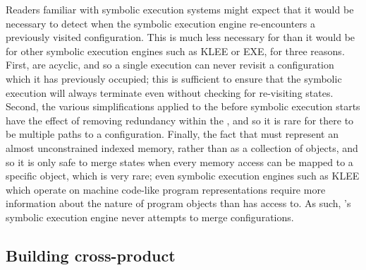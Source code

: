 Readers familiar with symbolic execution systems might expect that it
would be necessary to detect when the symbolic execution engine
re-encounters a previously visited configuration.  This is much less
necessary for {\technique} than it would be for other symbolic
execution engines such as KLEE\needCite{} or EXE\needCite{}, for three
reasons.  First, {\technique} {\StateMachines} are acyclic, and so a
single execution can never revisit a configuration which it has
previously occupied; this is sufficient to ensure that the symbolic
execution will always terminate even without checking for re-visiting
states.  Second, the various simplifications applied to the
{\StateMachines} before symbolic execution starts have the effect of
removing redundancy within the {\StateMachines}, and so it is rare for
there to be multiple paths to a configuration.  Finally, the fact that
{\technique} must represent an almost unconstrained indexed memory,
rather than as a collection of objects, and so it is only safe to
merge states when every memory access can be mapped to a specific
object, which is very rare; even symbolic execution engines such as KLEE which operate
on machine code-like program representations require more information
about the nature of program objects than {\technique} has access
to.
As such, {\implementation}'s symbolic execution engine never attempts
to merge configurations.

\subsection{Building cross-product {\StateMachines}}
\label{sect:using:build_cross_product}


